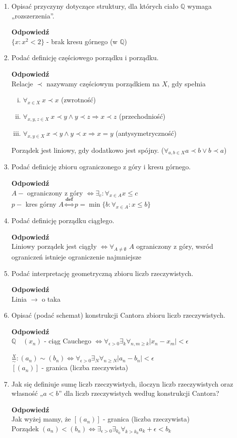 \documentclass[12pt,a4paper]{article}
\theoremstyle{break}
\newcommand{\Odp}[1]{
		\begin{mdframed}[style=zadanie]
			\textbf{Odpowiedź}\\
			#1
		\end{mdframed}
	}
\begin{document}
\begin{enumerate}[1.]
	\item Opisać przyczyny dotyczące struktury, dla których ciało $\mathbb{Q}$ wymaga „rozszerzenia”.
	\Odp{
		$\{ x: x^2<2\}$ - brak kresu górnego (w $\mathbb{Q}$)
	}
	\newpage
	\item Podać definicję częściowego porządku i porządku.
	\Odp{
		Relacje $\prec$ nazywamy częściowym porządkiem na $X$, gdy spełnia
		\begin{enumerate}[i)]
			\item $\forall_{x \in X} \:x \prec x$ (zwrotność)
			\item $\forall_{x,y,z \in X} \: x\prec y \wedge y\prec z \Rightarrow x\prec z$ (przechodniość)
			\item $\forall_{x,y\in X} \: x\prec y \wedge y \prec x \Rightarrow x = y$ (antysymetryczność)
		\end{enumerate}
		
		Porządek jest liniowy, gdy dodatkowo jest spójny. ($\forall_{a,b \in X} a\prec b \vee b \prec a$)
	}
	
	\item Podać definicję zbioru ograniczonego z góry i kresu górnego.
	\Odp{
	$A-$ ograniczony z góry $\Leftrightarrow \exists_c : \forall_{x\in A} x\leq c$\\
	$p-$ kres górny $A \overset{\textbf{def}}{\Leftrightarrow} p=\min\{b:\forall_{x\in A} : x\leq b\}$
	}
	
	\item Podać definicję porządku ciągłego.
	\Odp{
	Liniowy porządek jest ciągły $\Leftrightarrow \forall_{A\neq \emptyset}$ $A$ ograniczony z góry, wsród ograniczeń istnieje ograniczenie najmniejsze
	}
	
	\item Podać interpretację geometryczną zbioru liczb rzeczywistych.
	\Odp{
	Linia $\longrightarrow$ o taka
	}
	
	\item Opisać (podać schemat) konstrukcji Cantora zbioru liczb rzeczywistych.
	\Odp{
		$\mathbb{Q} \quad (x_n)$ - ciąg Cauchego $\Leftrightarrow \forall_{\epsilon>0} \exists_{k} \forall_{n,m\geq k} |x_n-x_m|<\epsilon$
		
		$\frac{X}{\sim}: (a_n)\sim(b_n) \Leftrightarrow \forall_{\epsilon>0} \exists_N \forall_{n\geq N} |a_n-b_n|<\epsilon$\\
		$[(a_n)]$ - granica (liczba rzeczywista)
	}
	
	\item Jak się definiuje sumę liczb rzeczywistych, iloczyn liczb rzeczywistych oraz własność „$a < b$” dla liczb rzeczywistych według konstrukcji Cantora?
	\Odp{
		Jak wyżej mamy, że $[(a_n)]$ - granica (liczba rzeczywista)\\
		Porządek $(a_n) < (b_n) \Leftrightarrow \exists_{\epsilon>0} \exists_{k_0} \forall_{k>k_0} a_k + \epsilon < b_k$
		
}
\end{enumerate}
\end{document}
